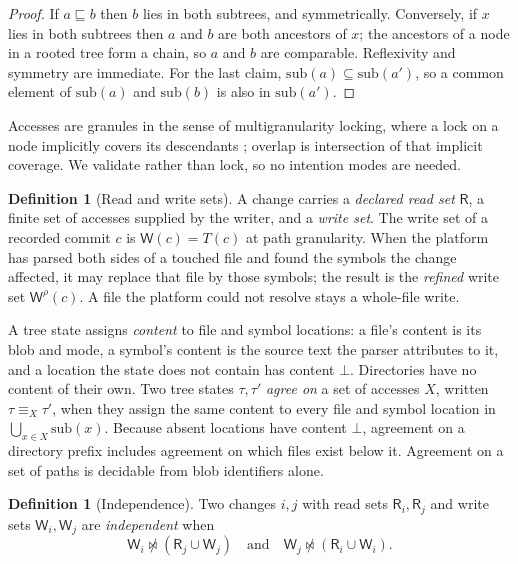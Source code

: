 \documentclass[11pt,letterpaper]{article}
\theoremstyle{definition}
\newtheorem{definition}[theorem]{Definition}
\theoremstyle{remark}
\newcommand{\R}{\mathsf{R}}
\newcommand{\W}{\mathsf{W}}
\newcommand{\nmeets}{\not\bowtie}
\newcommand{\cov}{\sqsubseteq}
\newcommand{\tree}{\tau}
\begin{document}
\begin{proof}
If $a\cov b$ then $b$ lies in both subtrees, and symmetrically. Conversely, if $x$ lies in both subtrees then $a$ and $b$ are both ancestors of $x$; the ancestors of a node in a rooted tree form a chain, so $a$ and $b$ are comparable. Reflexivity and symmetry are immediate. For the last claim, $\mathrm{sub}(a)\subseteq\mathrm{sub}(a')$, so a common element of $\mathrm{sub}(a)$ and $\mathrm{sub}(b)$ is also in $\mathrm{sub}(a')$.
\end{proof}

Accesses are granules in the sense of multigranularity locking, where a lock on a node implicitly covers its descendants \cite[Section 3.9]{bhg1987}; overlap is intersection of that implicit coverage. We validate rather than lock, so no intention modes are needed.

\begin{definition}[Read and write sets]
\label{def:tlsc:rwsets}
A change carries a \emph{declared read set} $\R$, a finite set of accesses supplied by the writer, and a \emph{write set}. The write set of a recorded commit $c$ is $\W(c)=T(c)$ at path granularity. When the platform has parsed both sides of a touched file and found the symbols the change affected, it may replace that file by those symbols; the result is the \emph{refined} write set $\W^{\rho}(c)$. A file the platform could not resolve stays a whole-file write.
\end{definition}

A tree state assigns \emph{content} to file and symbol locations: a file's content is its blob and mode, a symbol's content is the source text the parser attributes to it, and a location the state does not contain has content $\bot$. Directories have no content of their own. Two tree states $\tree,\tree'$ \emph{agree on} a set of accesses $X$, written $\tree\equiv_X\tree'$, when they assign the same content to every file and symbol location in $\bigcup_{x\in X}\mathrm{sub}(x)$. Because absent locations have content $\bot$, agreement on a directory prefix includes agreement on which files exist below it. Agreement on a set of paths is decidable from blob identifiers alone.

\begin{definition}[Independence]
\label{def:tlsc:independence}
Two changes $i,j$ with read sets $\R_i,\R_j$ and write sets $\W_i,\W_j$ are \emph{independent} when
\begin{equation}
\W_i\nmeets(\R_j\cup\W_j)\quad\text{and}\quad\W_j\nmeets(\R_i\cup\W_i).
\label{eq:tlsc:independent}
\end{equation}
\end{definition}
\end{document}
